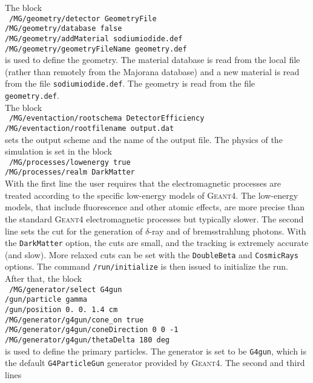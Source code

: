 \documentclass[a4paper,12pt,twoside]{article}
\begin{document}
The block \\ 
\texttt{
/MG/geometry/detector GeometryFile\\
/MG/geometry/database false\\
/MG/geometry/addMaterial sodiumiodide.def\\
/MG/geometry/geometryFileName geometry.def\\
}
is used to define the geometry. The \mage material database is read from the local file 
(rather than remotely from the Majorana database) and a new material is read from the file 
\texttt{sodiumiodide.def}. The geometry is read from the file \texttt{geometry.def}. \\
The block \\
\texttt{
/MG/eventaction/rootschema DetectorEfficiency\\
/MG/eventaction/rootfilename output.dat\\
}
sets the output scheme and the name of the output file. The physics of the simulation is set in 
the block\\
\texttt{
/MG/processes/lowenergy true\\
/MG/processes/realm DarkMatter\\}
With the first line the user requires that the electromagnetic processes are treated according to 
the specific low-energy models of \textsc{Geant4}. The low-energy models, that include fluorescence 
and other atomic effects, are more precise than the standard \textsc{Geant4} electromagnetic processes 
but typically slower. The second line sets the cut for the generation of $\delta$-ray and of 
bremsstrahlung photons. With the \texttt{DarkMatter} option, the cuts are small, and the tracking is 
extremely accurate (and slow). More relaxed cuts can be set with the \texttt{DoubleBeta} and 
\texttt{CosmicRays} options. The command 
\texttt{/run/initialize} is then issued to initialize the \mage run.
After that, the block\\
\texttt{ 
/MG/generator/select G4gun \\
/gun/particle gamma\\
/gun/position 0. 0. 1.4 cm\\
/MG/generator/g4gun/cone\_on true\\
/MG/generator/g4gun/coneDirection 0 0 -1\\
/MG/generator/g4gun/thetaDelta 180 deg\\}
is used to define the primary particles. The generator is set to be \texttt{G4gun}, which is the 
default \texttt{G4ParticleGun} generator provided by \textsc{Geant4}. The second and third lines 
\end{document}
